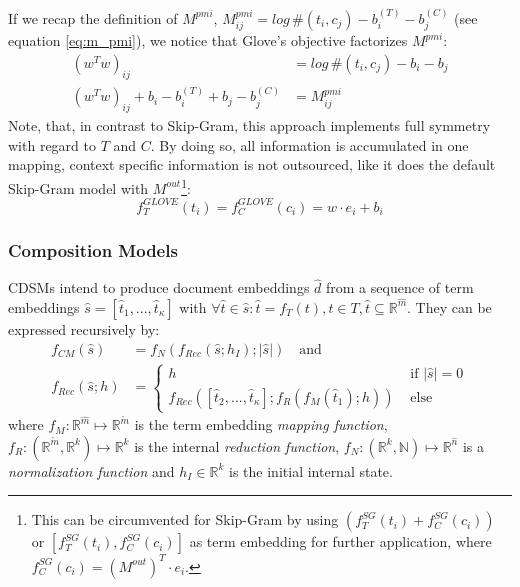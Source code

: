 If we recap the definition of $M^{pmi}$, $M^{pmi}_{ij}= log\,\#(t_i, c_j) - b^{(T)}_i - b^{(C)}_j$ (see equation \eqref{eq:m_pmi}), we notice that Glove's objective factorizes $M^{pmi}$:%
\begin{align}
(w^Tw)_{ij} & = log\,\#(t_i, c_j) - b_i - b_j \\
(w^Tw)_{ij} + b_i - b^{(T)}_i + b_j - b^{(C)}_j & = M^{pmi}_{ij}
\end{align}
Note, that, in contrast to Skip-Gram, this approach implements full symmetry with regard to $T$ and $C$. By doing so, all information is accumulated in one mapping, context specific information is not outsourced, like it does the default Skip-Gram model with $M^{out}$\footnote{This can be circumvented for Skip-Gram by using $(f^{SG}_T(t_i) + f^{SG}_C(c_i))$ or $[f^{SG}_T(t_i), f^{SG}_C(c_i)]$ as term embedding for further application, where $f_C^{SG}(c_i) = (M^{out})^T \cdot e_i$.}:
\begin{equation}
f_T^{GLOVE}(t_i) = f_C^{GLOVE}(c_i) = w \cdot e_i + b_i 
\end{equation}

\subsubsection{Composition Models}
\acfp{CDSM}  intend to produce document embeddings $\hat{d}$ from a sequence of term embeddings $\hat{s} = [\hat{t}_1, ..., \hat{t}_\kappa]$ with $\forall \hat{t} \in \hat{s}: \hat{t} = f_T(t), t \in T, \hat{t} \subseteq \mathbb{R}^{\hat{m}}$. They can be expressed recursively by:
\begin{equation}
\begin{split}
f_{CM}(\hat{s}) & = f_N(f_{Rec}(\hat{s}; h_I); |\hat{s}|) \quad \text{and} \\
f_{Rec}(\hat{s}; h) & = 
  \begin{cases}  
    h & \text{ if }|\hat{s}|=0 \\
    f_{Rec}([\hat{t}_2, ..., \hat{t}_\kappa]; f_R(f_M(\hat{t}_1); h)) & \text{ else}
  \end{cases}
\end{split}
\end{equation}
where $f_M: \mathbb{R}^{\hat{m}} \mapsto \mathbb{R}^{\mathring{m}}$ is the term embedding \textit{mapping function}, $f_R: (\mathbb{R}^{\mathring{m}},\mathbb{R}^k) \mapsto \mathbb{R}^k$ is the internal \textit{reduction function}, $f_N: (\mathbb{R}^k, \mathbb{N}) \mapsto \mathbb{R}^{\hat{n}}$ is a \textit{normalization function} and $h_I \in \mathbb{R}^k$ is the initial internal state.

